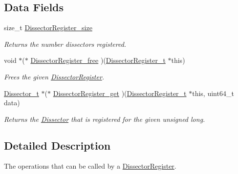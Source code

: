 \subsection*{Data Fields}
\begin{DoxyCompactItemize}
\item 
size\-\_\-t \hyperlink{struct_dissector_register__ops_abe25ddc2aed0125710137695861079e6}{Dissector\-Register\-\_\-size}
\begin{DoxyCompactList}\small\item\em Returns the number dissectors registered. \end{DoxyCompactList}\item 
\hypertarget{struct_dissector_register__ops_a07ea786eeed3d6b44ff0e8ceeac379f9}{void $\ast$($\ast$ \hyperlink{struct_dissector_register__ops_a07ea786eeed3d6b44ff0e8ceeac379f9}{Dissector\-Register\-\_\-free} )(\hyperlink{struct_dissector_register}{Dissector\-Register\-\_\-t} $\ast$this)}\label{struct_dissector_register__ops_a07ea786eeed3d6b44ff0e8ceeac379f9}

\begin{DoxyCompactList}\small\item\em Frees the given \hyperlink{struct_dissector_register}{Dissector\-Register}. \end{DoxyCompactList}\item 
\hyperlink{struct_dissector}{Dissector\-\_\-t} $\ast$($\ast$ \hyperlink{struct_dissector_register__ops_a3ecfba9eaa94eab24cf5a4c205860603}{Dissector\-Register\-\_\-get} )(\hyperlink{struct_dissector_register}{Dissector\-Register\-\_\-t} $\ast$this, uint64\-\_\-t data)
\begin{DoxyCompactList}\small\item\em Returns the \hyperlink{struct_dissector}{Dissector} that is registered for the given unsigned long. \end{DoxyCompactList}\end{DoxyCompactItemize}


\subsection{Detailed Description}
The operations that can be called by a \hyperlink{struct_dissector_register}{Dissector\-Register}. 

